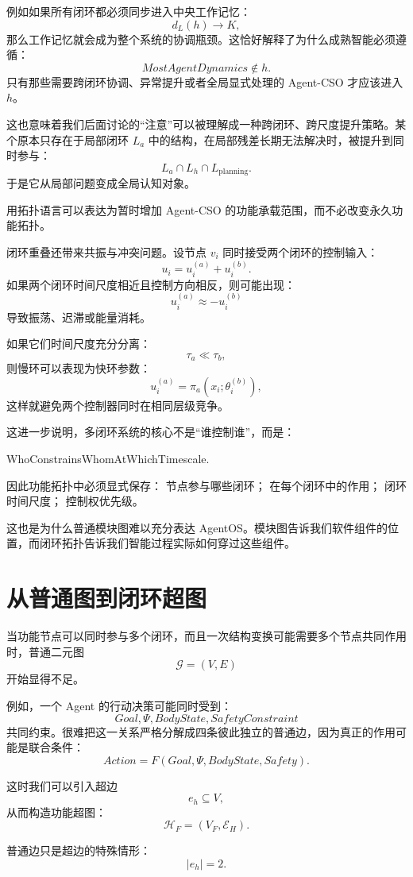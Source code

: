 例如如果所有闭环都必须同步进入中央工作记忆：
\[
d_L(h)\rightarrow K,
\]
那么工作记忆就会成为整个系统的协调瓶颈。这恰好解释了为什么成熟智能必须遵循：
\[
MostAgentDynamics\notin h.
\]
只有那些需要跨闭环协调、异常提升或者全局显式处理的 Agent-CSO 才应该进入 $h$。

这也意味着我们后面讨论的“注意”可以被理解成一种跨闭环、跨尺度提升策略。某个原本只存在于局部闭环 $L_a$ 中的结构，在局部残差长期无法解决时，被提升到同时参与：
\[
L_a
\cap
L_h
\cap
L_{\mathrm{planning}}.
\]
于是它从局部问题变成全局认知对象。

用拓扑语言可以表达为暂时增加 Agent-CSO 的功能承载范围，而不必改变永久功能拓扑。

闭环重叠还带来共振与冲突问题。设节点 $v_i$ 同时接受两个闭环的控制输入：
\[
u_i
=
u_i^{(a)}+u_i^{(b)}.
\]
如果两个闭环时间尺度相近且控制方向相反，则可能出现：
\[
u_i^{(a)}\approx -u_i^{(b)}
\]
导致振荡、迟滞或能量消耗。

如果它们时间尺度充分分离：
\[
\tau_a\ll\tau_b,
\]
则慢环可以表现为快环参数：
\[
u_i^{(a)}
=
\pi_a
\left(
x_i;
\theta_i^{(b)}
\right),
\]
这样就避免两个控制器同时在相同层级竞争。

这进一步说明，多闭环系统的核心不是“谁控制谁”，而是：
\begin{statementbox}
WhoConstrainsWhomAtWhichTimescale.
\end{statementbox}

因此功能拓扑中必须显式保存：
节点参与哪些闭环；
在每个闭环中的作用；
闭环时间尺度；
控制权优先级。

这也是为什么普通模块图难以充分表达 AgentOS。模块图告诉我们软件组件的位置，而闭环拓扑告诉我们智能过程实际如何穿过这些组件。


\section{从普通图到闭环超图}

当功能节点可以同时参与多个闭环，而且一次结构变换可能需要多个节点共同作用时，普通二元图
\[
\mathcal G=(V,E)
\]
开始显得不足。

例如，一个 Agent 的行动决策可能同时受到：
\[
Goal,
\Psi,
BodyState,
SafetyConstraint
\]
共同约束。很难把这一关系严格分解成四条彼此独立的普通边，因为真正的作用可能是联合条件：
\[
Action
=
F
\left(
Goal,
\Psi,
BodyState,
Safety
\right).
\]

这时我们可以引入超边
\[
e_h
\subseteq V,
\]
从而构造功能超图：
\[
\boxed{
\mathcal H_F=(V_F,\mathcal E_H).
}
\]

普通边只是超边的特殊情形：
\[
|e_h|=2.
\]


